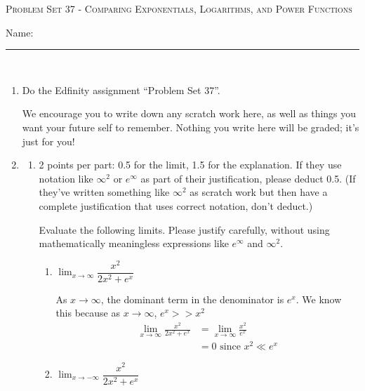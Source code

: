 \documentclass{article}
\newcommand{\doedfinity}[2][\newpage]{
  \begin{problem}[#1]
    Do the Edfinity assignment ``Problem Set #2''.

    We encourage you to write down any scratch work here, as well as
    things you want your future self to remember. Nothing you write
    here will be graded; it's just for you!
  \end{problem}
}
\begin{document}
\begin{center}
  \large\textsc{Problem Set 37 - Comparing Exponentials, Logarithms, and Power Functions}\vspace{.5in}\\
  \begin{problemonly}
   \large Name: \rule{5cm}{0.15mm}\\
   \end{problemonly}
\end{center}

\begin{enumerate}
\item \doedfinity{37}

\item  

  \begin{enumerate}
  \item \label{growth-rate-limits-1}

    \begin{grading}
      2 points per part: 0.5 for the limit, 1.5 for the explanation. If they use notation like $\infty^2$ or $e^\infty$ as part of their justification, please deduct 0.5. (If they've written something like $\infty^2$ as scratch work but then have a complete justification that uses correct notation, don't deduct.)
    \end{grading}

    Evaluate the following limits. Please justify carefully, without using mathematically meaningless expressions like $e^\infty$ and $\infty^2$.

    \begin{enumerate}
    \item
      \begin{problem}[\vfill]
        $\displaystyle \lim_{x \to \infty} \dfrac{x^2}{2x^2 + e^x}$
      \end{problem}

      \begin{solution}
      As $x \to \infty$, the dominant term in the denominator is
      $e^x$. We know this because as $x \to \infty$, $e^x>>x^2$ 
        \begin{align*}
          \lim_{x \to \infty} \frac{x^2}{2x^2 + e^x} &= 
          \lim_{x \to \infty} \frac{x^2}{e^x} \\
          &= 0 \text{ since $x^2 \ll e^x$}
        \end{align*}
      \end{solution}

    \item
      \begin{problem}[\vfill]
        $\displaystyle \lim_{x \to -\infty} \dfrac{x^2}{2x^2 + e^x}$
      \end{problem}


\end{enumerate}
\end{enumerate}
\end{enumerate}
\end{document}
